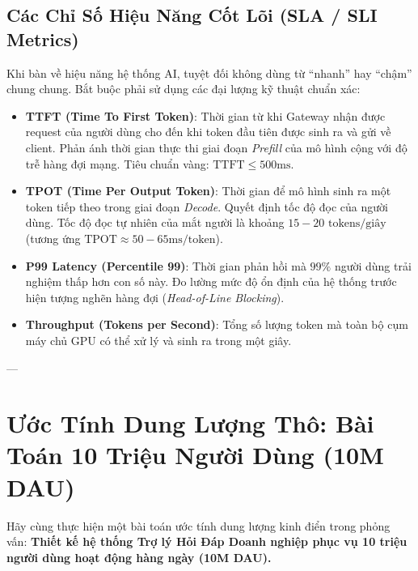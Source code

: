 \subsection{Các Chỉ Số Hiệu Năng Cốt Lõi (SLA / SLI Metrics)}

Khi bàn về hiệu năng hệ thống AI, tuyệt đối không dùng từ ``nhanh'' hay ``chậm'' chung chung. Bắt buộc phải sử dụng các đại lượng kỹ thuật chuẩn xác:
\begin{itemize}
  \item \textbf{TTFT (Time To First Token)}: Thời gian từ khi Gateway nhận được request của người dùng cho đến khi token đầu tiên được sinh ra và gửi về client. Phản ánh thời gian thực thi giai đoạn \textit{Prefill} của mô hình cộng với độ trễ hàng đợi mạng. Tiêu chuẩn vàng: $\text{TTFT} \le 500\text{ms}$.
  \item \textbf{TPOT (Time Per Output Token)}: Thời gian để mô hình sinh ra một token tiếp theo trong giai đoạn \textit{Decode}. Quyết định tốc độ đọc của người dùng. Tốc độ đọc tự nhiên của mắt người là khoảng $15 - 20\text{ tokens/giây}$ (tương ứng $\text{TPOT} \approx 50 - 65\text{ms/token}$).
  \item \textbf{P99 Latency (Percentile 99)}: Thời gian phản hồi mà $99\%$ người dùng trải nghiệm thấp hơn con số này. Đo lường mức độ ổn định của hệ thống trước hiện tượng nghẽn hàng đợi (\textit{Head-of-Line Blocking}).
  \item \textbf{Throughput (Tokens per Second)}: Tổng số lượng token mà toàn bộ cụm máy chủ GPU có thể xử lý và sinh ra trong một giây.
\end{itemize}

---

\section{Ước Tính Dung Lượng Thô: Bài Toán 10 Triệu Người Dùng (10M DAU)}
\label{sec:ch13-estimation}

Hãy cùng thực hiện một bài toán ước tính dung lượng kinh điển trong phỏng vấn: \textbf{Thiết kế hệ thống Trợ lý Hỏi Đáp Doanh nghiệp phục vụ 10 triệu người dùng hoạt động hàng ngày (10M DAU).}

